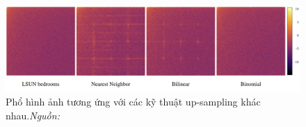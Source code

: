 %
%
\begin{figure}[h]
	\centering
	\includegraphics[width=1.0\linewidth]{Images/frank-spectrum-up-sampling-1.png}
	\begin{minipage}{0.9\linewidth}
		\caption{Phổ hình ảnh tương ứng với các kỹ thuật \gls{up-sampling} khác nhau.\textit{Nguồn: \cite{Frank2020LeveragingFA}}}
		\label{fig:frank-spectrum-up-sampling-1}
	\end{minipage}
\end{figure}
%

